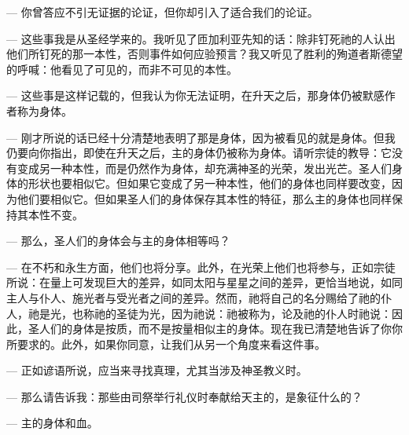 — 你曾答应不引无证据的论证，但你却引入了适合我们的论证。\par

— 这些事我是从圣经学来的。我听见了匝加利亚先知的话：除非钉死祂的人认出他们所钉死的那一本性，否则事件如何应验预言？我又听见了胜利的殉道者斯德望的呼喊：他看见了可见的，而非不可见的本性。\par

— 这些事是这样记载的，但我认为你无法证明，在升天之后，那身体仍被默感作者称为身体。\par

— 刚才所说的话已经十分清楚地表明了那是身体，因为被看见的就是身体。但我仍要向你指出，即使在升天之后，主的身体仍被称为身体。请听宗徒的教导：它没有变成另一种本性，而是仍然作为身体，却充满神圣的光荣，发出光芒。圣人们身体的形状也要相似它。但如果它变成了另一种本性，他们的身体也同样要改变，因为他们要相似它。但如果圣人们的身体保存其本性的特征，那么主的身体也同样保持其本性不变。\par

— 那么，圣人们的身体会与主的身体相等吗？\par

— 在不朽和永生方面，他们也将分享。此外，在光荣上他们也将参与，正如宗徒所说：在量上可发现巨大的差异，如同太阳与星星之间的差异，更恰当地说，如同主人与仆人、施光者与受光者之间的差异。然而，祂将自己的名分赐给了祂的仆人，祂是光，也称祂的圣徒为光，因为祂说：祂被称为，论及祂的仆人时祂说：因此，圣人们的身体是按质，而不是按量相似主的身体。现在我已清楚地告诉了你你所要求的。此外，如果你同意，让我们从另一个角度来看这件事。\par

— 正如谚语所说，应当来寻找真理，尤其当涉及神圣教义时。\par

— 那么请告诉我：那些由司祭举行礼仪时奉献给天主的，是象征什么的？\par

— 主的身体和血。\par

